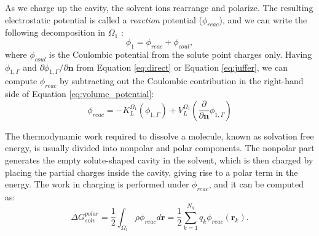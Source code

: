 As we charge up the cavity, the solvent ions rearrange and polarize.
The resulting electrostatic potential is called a \emph{reaction} potential ($\phi_{reac}$), and we can write the following decomposition in $\Omega_1$ :
%
\begin{equation}
\phi_1 = \phi_{reac} + \phi_{coul},
\end{equation}
%
where $\phi_{coul}$ is the Coulombic potential from the solute point charges only.
Having $\phi_{1,\Gamma}$ and $\partial\phi_{1,\Gamma}/\partial\mathbf{n}$ from Equation \eqref{eq:direct} or Equation \eqref{eq:juffer}, we can compute $\phi_{reac}$ by subtracting out the Coulombic contribution in the right-hand side of Equation \eqref{eq:volume_potential}:
%
\begin{equation}\label{eq:phi_reac}
\phi_{reac} = -K_{L}^{\Omega_1}(\phi_{1,\Gamma}) +  V_{L}^{\Omega_1} \left(\frac{\partial}{\partial \mathbf{n}}  \phi_{1,\Gamma}  \right) 
\end{equation}

The thermodynamic work required to dissolve a molecule, known as solvation free energy, is usually divided into nonpolar and polar components.
The nonpolar part generates the empty solute-shaped cavity in the solvent, which is then charged by placing the partial charges inside the cavity, giving rise to a polar term in the energy. 
The work in charging is performed under $\phi_{reac}$, and it can be computed as:
%
\begin{equation} \label{eq:energy}
\Delta G^{polar}_{solv} = \frac{1}{2}\int_{\Omega_1} \rho\phi_{reac}d\mathbf{r} = \frac{1}{2}\sum_{k=1}^{N_q}q_k\phi_{reac}(\mathbf{r}_k).
\end{equation}
